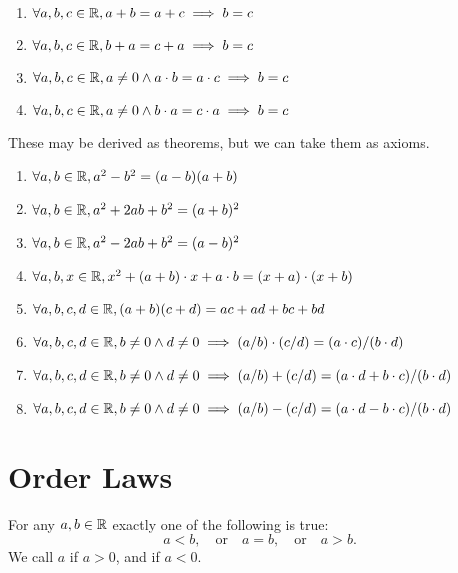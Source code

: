 \begin{enumerate}[resume*]
\item $\forall a,b,c\in\mathbb{R}, a+b=a+c\implies b=c$
\item $\forall a,b,c\in\mathbb{R}, b+a=c+a\implies b=c$
\item $\forall a,b,c\in\mathbb{R}, a\neq0\land a\cdot b=a\cdot c\implies b=c$
\item $\forall a,b,c\in\mathbb{R}, a\neq0\land b\cdot a=c\cdot a\implies b=c$
\end{enumerate}

These may be derived as theorems, but we can take them as axioms.
\begin{enumerate}[resume*]
\item $\forall a,b\in\mathbb{R}, a^{2} - b^{2} = (a-b)(a+b)$
\item $\forall a,b\in\mathbb{R}, a^{2} + 2ab + b^{2} = (a+b)^{2}$
\item $\forall a,b\in\mathbb{R}, a^{2} - 2ab + b^{2} = (a-b)^{2}$
\item $\forall a,b,x\in\mathbb{R}, x^{2} + (a+b)\cdot x + a\cdot b = (x+a)\cdot(x+b)$
\item $\forall a,b,c,d\in\mathbb{R}, (a+b)(c+d) = ac+ad+bc+bd$
\item $\forall a,b,c,d\in\mathbb{R}, b\neq0\land d\neq0\implies (a/b)\cdot(c/d) = (a\cdot c)/(b\cdot d)$
\item $\forall a,b,c,d\in\mathbb{R}, b\neq0\land d\neq0\implies (a/b) + (c/d) = (a\cdot d + b\cdot c)/(b\cdot d)$
\item $\forall a,b,c,d\in\mathbb{R}, b\neq0\land d\neq0\implies (a/b) - (c/d) = (a\cdot d - b\cdot c)/(b\cdot d)$
\end{enumerate}

\section{Order Laws}

 For any $a,b\in\mathbb{R}$ exactly one of the following is
true:
\begin{equation}
a < b,\quad\mbox{or}\quad a=b,\quad\mbox{or}\quad a>b.
\end{equation}
We call $a$  if $a>0$, and  if $a<0$.


